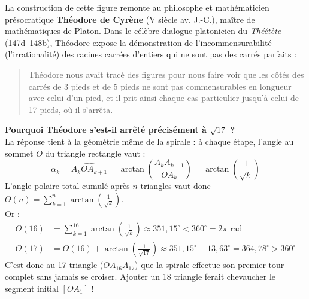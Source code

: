 \documentclass[11pt,a4paper]{article}
\begin{document}
\begin{prolongementbox}
La construction de cette figure remonte au philosophe et mathématicien présocratique \textbf{Théodore de Cyrène} (V\ieme{} siècle av. J.-C.), maître de mathématiques de Platon. Dans le célèbre dialogue platonicien du \emph{Théétète} (147d--148b), Théodore expose la démonstration de l'incommensurabilité (l'irrationalité) des racines carrées d'entiers qui ne sont pas des carrés parfaits :
\begin{quote}
\og Théodore nous avait tracé des figures pour nous faire voir que les côtés des carrés de 3 pieds et de 5 pieds ne sont pas commensurables en longueur avec celui d'un pied, et il prit ainsi chaque cas particulier jusqu'à celui de 17 pieds, où il s'arrêta. \fg
\end{quote}

\textbf{Pourquoi Théodore s'est-il arrêté précisément à $\sqrt{17}$ ?}\\
La réponse tient à la géométrie même de la spirale : à chaque étape, l'angle au sommet $O$ du triangle rectangle vaut :
\[
\alpha_k = \widehat{A_k O A_{k+1}} = \arctan\left(\frac{A_k A_{k+1}}{OA_k}\right) = \arctan\left(\frac{1}{\sqrt{k}}\right)
\]
L'angle polaire total cumulé après $n$ triangles vaut donc $\Theta(n) = \sum_{k=1}^n \arctan\left(\frac{1}{\sqrt{k}}\right)$.\\
Or :
\begin{align*}
\Theta(16) &= \sum_{k=1}^{16} \arctan\left(\frac{1}{\sqrt{k}}\right) \approx 351{,}15^\circ < 360^\circ = 2\pi\text{ rad} \\
\Theta(17) &= \Theta(16) + \arctan\left(\frac{1}{\sqrt{17}}\right) \approx 351{,}15^\circ + 13{,}63^\circ = 364{,}78^\circ > 360^\circ
\end{align*}
C'est donc au 17\ieme{} triangle ($OA_{16}A_{17}$) que la spirale effectue son premier tour complet sans jamais se croiser. Ajouter un 18\ieme{} triangle ferait chevaucher le segment initial $[OA_1]$ !

\begin{center}
\end{center}
\end{prolongementbox}
\end{document}
